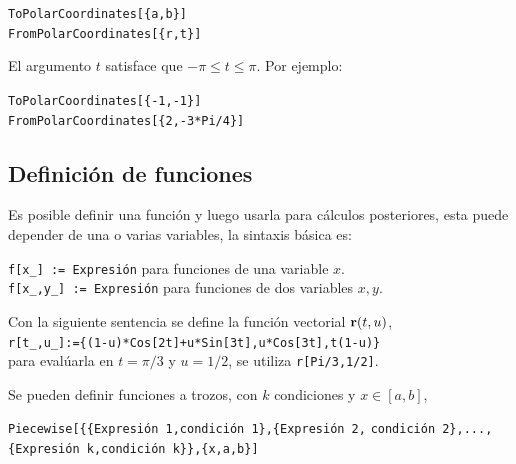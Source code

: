     \begin{tcolorbox}
      \verb"ToPolarCoordinates[{a,b}]"\\
      \verb"FromPolarCoordinates[{r,t}]"
    \end{tcolorbox}

    El argumento $t$ satisface que $-\pi \leq t \leq \pi$. Por ejemplo:
    \begin{tcolorbox}
      \verb"ToPolarCoordinates[{-1,-1}]"\\
      \verb"FromPolarCoordinates[{2,-3*Pi/4}]"
    \end{tcolorbox}

    \subsection{Definición de funciones}
    Es posible definir una función y luego usarla para cálculos posteriores,
    esta puede depender de una o varias variables, la sintaxis básica es:

    \begin{tcolorbox}[title=Definición de funciones]
      \verb"f[x_] := Expresión" para funciones de una variable $x$. \\
      \verb"f[x_,y_] := Expresión" para funciones de dos variables $x,y$.
    \end{tcolorbox}
    Con la siguiente sentencia se define la función vectorial ${\bf r}(t,u)$, \\
    \verb"r[t_,u_]:={(1-u)*Cos[2t]+u*Sin[3t],u*Cos[3t],t(1-u)}" \\
    para evalúarla en $t=\pi/3$ y $u=1/2$, se utiliza \verb"r[Pi/3,1/2]".

    Se pueden definir funciones a trozos, con $k$ condiciones y $x \in [a,b]$,
    \begin{tcolorbox}[title=Definición de funciones a trozos]
      \verb"Piecewise[{{Expresión 1,condición 1},{Expresión 2,"
      \verb"condición 2},...,{Expresión k,condición k}},{x,a,b}]"
    \end{tcolorbox}  

    \enlargethispage{\baselineskip}

